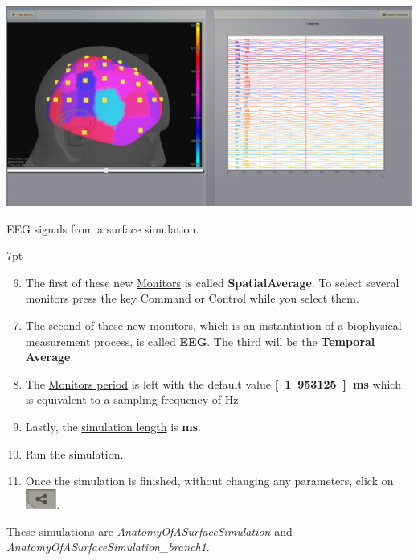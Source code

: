 \documentclass{tufte-handout}
\newenvironment{simulation}{%
  \def\FrameCommand{%
    \hspace{1pt}%
    {\color{ForestGreen}\vrule width 2pt}%
    {\color{simulationshade}\vrule width 4pt}%
    \colorbox{simulationshade}%
  }%
  \MakeFramed{\advance\hsize-\width\FrameRestore}%
  \noindent\hspace{-4.55pt}%
  \begin{adjustwidth}{}{7pt}%
  \vspace{2pt}\vspace{2pt}%
}
{%
  \vspace{2pt}\end{adjustwidth}\endMakeFramed%
}
\begin{document}
\begin{marginfigure}
  \includegraphics[width=\linewidth]{Handout_UI_BuildingYourOwnBrainNetworkModel_MexicanLocalConnectivityPotatoHead.png}%
  \caption{EEG signals from a surface simulation.}%
  \label{fig:potato_head}%
\end{marginfigure}

\begin{simulation}
\begin{enumerate}[resume]
\setcounter{enumi}{5}
\item The first of these new \underline{Monitors} is called
\textbf{{SpatialAverage}}. To select several monitors press the key Command or Control while you select them.
\item The second of these new monitors, which is an instantiation of a
biophysical measurement process, is called \textbf{EEG}. The third will be the \textbf{Temporal Average}.
\item The \underline{Monitors period} is left with the default value \textbf{\unit[1.953125]{ms}} which is equivalent to a sampling frequency of \unit[256]{Hz}.
\item Lastly, the \underline{simulation length} is \textbf{\unit[500]{ms}}.
\item Run the simulation.
\item Once the simulation is finished, without changing any parameters, click on \includegraphics[width=0.08\textwidth]{butt_branching}.

\end{enumerate}
\end{simulation}


These simulations are \textit{AnatomyOfASurfaceSimulation} and \textit{AnatomyOfASurfaceSimulation\_branch1}. 
\end{document}

